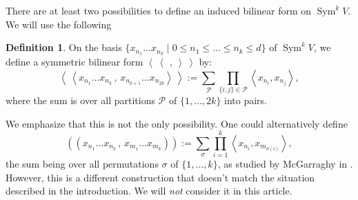 \documentclass{amsart}
\DeclareMathOperator{\Sym}{Sym}
\newcommand{\coloneqq}{:=}
\newcommand{\bra}{\left<\!\!\!\:\left<}
\newcommand{\ket}{\right>\!\!\!\:\right>}
\theoremstyle{plain}
\theoremstyle{definition}
\newtheorem{definition}[theorem]{Definition}
\theoremstyle{remark}
\begin{document}
There are at least two possibilities to define an induced bilinear form on $\Sym^kV$. We will use the following
\begin{definition} \label{formdef} On the basis $\{x_{n_1}\ldots x_{n_k}\;|\;0\leq n_1\leq\ldots\leq n_k\leq d\}$ of $\Sym^kV$, we define a symmetric bilinear form $\bra\ \,,\ \ket$ by: 
\begin{equation}
\label{mydef}
\bra x_{n_1}\ldots x_{n_k}\,,\,x_{n_{k+1}}\ldots x_{n_{2k}} \ket \coloneqq \sum_{\mathcal{P}} \prod_{\{i,j\}\in\mathcal{P}} \left<x_{n_i},x_{n_j}\right>,
\end{equation}
where the sum is over all partitions $\mathcal{P}$ of $\{1,\ldots,2k\}$ into pairs.
\end{definition}

We emphasize that this is not the only possibility. One could alternatively define
\begin{equation}\label{Garr}
\left(\!\left( x_{n_1}\ldots x_{n_k}\,,\, x_{m_1}\ldots x_{m_k}\right)\!\right) \coloneqq \sum_\sigma  
\prod_{i=1}^k \left< x_{n_i},x_{m_{\sigma(i)}}\right>,
\end{equation}
the sum being over all permutations $\sigma$ of $\{1,\ldots,k\}$, as studied by McGarraghy in \cite{McGarr}. However, this is a different construction that doesn't match the situation described in the introduction. We will \emph{not} consider it in this article.
\end{document}
